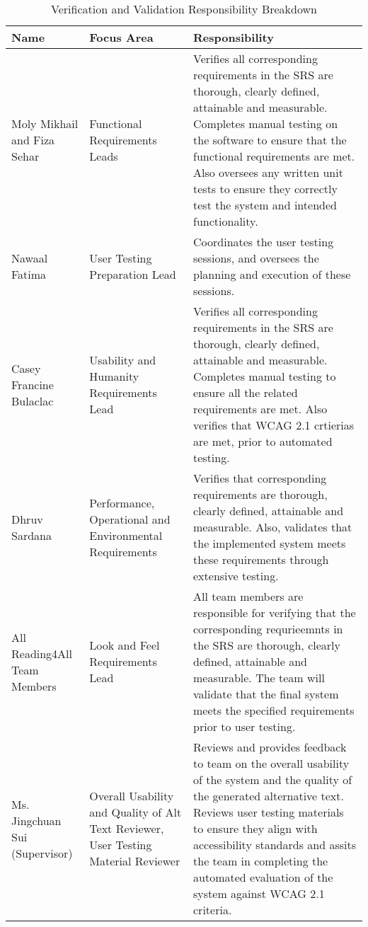 \documentclass[12pt, titlepage]{article}
\begin{document}
\begin{table}[H]
    \centering
    \caption{Verification and Validation Responsibility Breakdown}
    \label{tab:data-dictionary-reading4all}
    \begin{tabular}{ |p{3.0cm}|p{3.8cm}|p{7.3cm}| }
      \hline
      \textbf{Name} & \textbf{ Focus Area } & \textbf{Responsibility} \\
      \hline
      Moly Mikhail and Fiza Sehar & Functional Requirements Leads & Verifies all corresponding requirements in the SRS are thorough, clearly defined, attainable and measurable. Completes manual testing on the software to ensure that the functional requirements are met. Also oversees any written unit tests to ensure they correctly test the system and intended functionality. \\
      \hline
      Nawaal Fatima & User Testing Preparation Lead & Coordinates the user testing sessions, and oversees the planning and execution of these sessions. \\
      \hline 
      Casey Francine Bulaclac & Usability and Humanity Requirements Lead & Verifies all corresponding requirements in the SRS are thorough, clearly defined, attainable and measurable. Completes manual testing to ensure all the related requirements are met. Also verifies that WCAG 2.1 crtierias are met, prior to automated testing. \\
      \hline 
      Dhruv Sardana & Performance, Operational and Environmental Requirements & Verifies that corresponding requirements are thorough, clearly defined, attainable and measurable. Also, validates that the implemented system meets these requirements through extensive testing.  \\
      \hline 
      All Reading4All Team Members & Look and Feel Requirements Lead & All team members are responsible for verifying that the corresponding requrieemnts in the SRS are thorough, clearly defined, attainable and measurable. The team will validate that the final system meets the specified requirements prior to user testing. \\
      \hline
      Ms. Jingchuan Sui (Supervisor) & Overall Usability and Quality of Alt Text Reviewer, User Testing Material Reviewer& Reviews and provides feedback to team on the overall usability of the system and the quality of the generated alternative text. Reviews user testing materials to ensure they align with accessibility standards and assits the team in completing the automated evaluation of the system against WCAG 2.1 criteria. \\ 
      \hline
    \end{tabular}
  \end{table}
  
\end{document}
